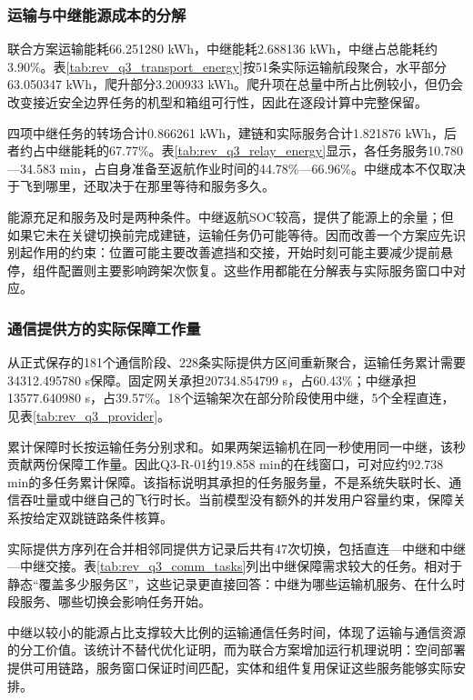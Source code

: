 \subsubsection{运输与中继能源成本的分解}
联合方案运输能耗66.251280 kWh，中继能耗2.688136 kWh，中继占总能耗约3.90\%。表\ref{tab:rev_q3_transport_energy}按51条实际运输航段聚合，水平部分63.050347 kWh，爬升部分3.200933 kWh。爬升项在总量中所占比例较小，但仍会改变接近安全边界任务的机型和箱组可行性，因此在逐段计算中完整保留。


四项中继任务的转场合计0.866261 kWh，建链和实际服务合计1.821876 kWh，后者约占中继能耗的67.77\%。表\ref{tab:rev_q3_relay_energy}显示，各任务服务10.780—34.583 min，占自身准备至返航作业时间的44.78\%—66.96\%。中继成本不仅取决于飞到哪里，还取决于在那里等待和服务多久。


能源充足和服务及时是两种条件。中继返航SOC较高，提供了能源上的余量；但如果它未在关键切换前完成建链，运输任务仍可能等待。因而改善一个方案应先识别起作用的约束：位置可能主要改善遮挡和交接，开始时刻可能主要减少提前悬停，组件配置则主要影响跨架次恢复。这些作用都能在分解表与实际服务窗口中对应。

\subsubsection{通信提供方的实际保障工作量}
从正式保存的181个通信阶段、228条实际提供方区间重新聚合，运输任务累计需要34312.495780 s保障。固定网关承担20734.854799 s，占60.43\%；中继承担13577.640980 s，占39.57\%。18个运输架次在部分阶段使用中继，5个全程直连，见表\ref{tab:rev_q3_provider}。


累计保障时长按运输任务分别求和。如果两架运输机在同一秒使用同一中继，该秒贡献两份保障工作量。因此Q3-R-01约19.858 min的在线窗口，可对应约92.738 min的多任务累计保障。该指标说明其承担的任务服务量，不是系统失联时长、通信吞吐量或中继自己的飞行时长。当前模型没有额外的并发用户容量约束，保障关系按给定双跳链路条件核算。

实际提供方序列在合并相邻同提供方记录后共有47次切换，包括直连—中继和中继—中继交接。表\ref{tab:rev_q3_comm_tasks}列出中继保障需求较大的任务。相对于静态“覆盖多少服务区”，这些记录更直接回答：中继为哪些运输机服务、在什么时段服务、哪些切换会影响任务开始。


中继以较小的能源占比支撑较大比例的运输通信任务时间，体现了运输与通信资源的分工价值。该统计不替代优化证明，而为联合方案增加运行机理说明：空间部署提供可用链路，服务窗口保证时间匹配，实体和组件复用保证这些服务能够实际安排。
